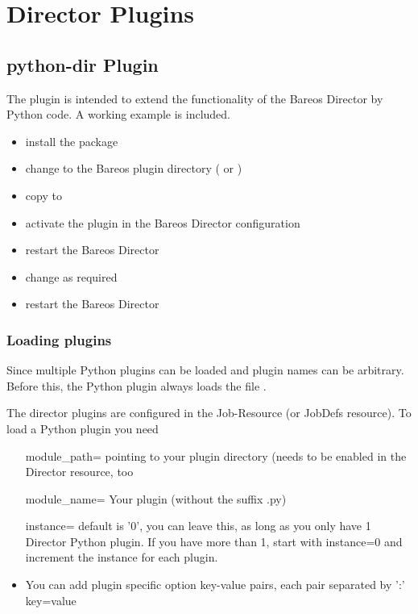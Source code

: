 \section{Director Plugins}
\label{dirPlugins}

\subsection{python-dir Plugin}
\label{director-python-plugin}

The  plugin is intended to extend the functionality of the Bareos Director by Python code.
A working example is included.

\begin{itemize}
    \item install the  package
    \item change to the Bareos plugin directory ( or )
    \item copy  to 
    \item activate the plugin in the Bareos Director configuration
    \item restart the Bareos Director
    \item change  as required
    \item restart the Bareos Director
\end{itemize}


\subsubsection{Loading plugins}

Since  multiple Python plugins can be loaded and plugin names can be arbitrary. Before this, the Python plugin always loads the file .

The director plugins are configured in the Job-Resource (or JobDefs resource). To load a Python plugin you need
\begin{itemize}
 \item [module\_path= ] pointing to your plugin directory (needs to be enabled in the Director resource, too
 \item [module\_name= ] Your plugin (without the suffix .py)
 \item [instance= ] default is '0', you can leave this, as long as you only have 1 Director Python plugin. If you have more than 1, start with instance=0 and increment the instance for each plugin.
 \item You can add plugin specific option key-value pairs, each pair separated by ':' key=value
\end{itemize}


